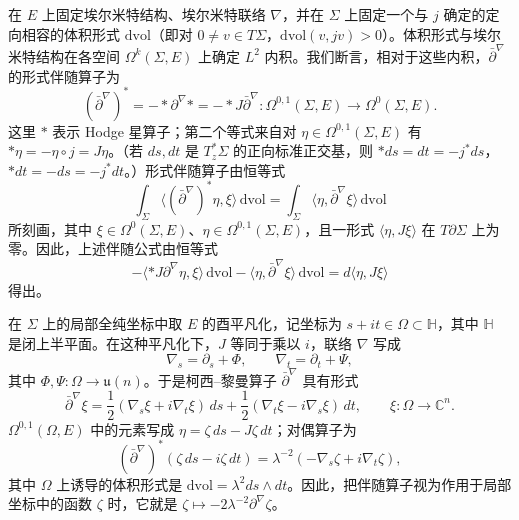 \begin{remark}\label{rem:C-1-3}
在 $E$ 上固定埃尔米特结构、埃尔米特联络 $\nabla$，并在 $\Sigma$ 上固定一个与 $j$ 确定的定向相容的体积形式 $\mathrm{dvol}$（即对 $0\ne v\in T\Sigma$，$\mathrm{dvol}(v,jv)>0$）。体积形式与埃尔米特结构在各空间 $\Omega^k(\Sigma,E)$ 上确定 $L^2$ 内积。我们断言，相对于这些内积，$\bar\partial^\nabla$ 的形式伴随算子为
\begin{equation}\label{eq:C-1-1}
  (\bar\partial^\nabla)^*=-*\partial^\nabla*=-*J\bar\partial^\nabla:
  \Omega^{0,1}(\Sigma,E)\longrightarrow\Omega^0(\Sigma,E).
\end{equation}
这里 $*$ 表示 Hodge 星算子；第二个等式来自对 $\eta\in\Omega^{0,1}(\Sigma,E)$ 有 $*\eta=-\eta\circ j=J\eta$。（若 $ds,dt$ 是 $T_z^*\Sigma$ 的正向标准正交基，则 $*ds=dt=-j^*ds$，$*dt=-ds=-j^*dt$。）形式伴随算子由恒等式
\begin{equation}\label{eq:C-1-2}
  \int_\Sigma\langle(\bar\partial^\nabla)^*\eta,\xi\rangle\,\mathrm{dvol}
  =\int_\Sigma\langle\eta,\bar\partial^\nabla\xi\rangle\,\mathrm{dvol}
\end{equation}
所刻画，其中 $\xi\in\Omega^0(\Sigma,E)$、$\eta\in\Omega^{0,1}(\Sigma,E)$，且一形式 $\langle\eta,J\xi\rangle$ 在 $T\partial\Sigma$ 上为零。因此，上述伴随公式由恒等式
\[
  -\langle*J\partial^\nabla\eta,\xi\rangle\,\mathrm{dvol}
  -\langle\eta,\bar\partial^\nabla\xi\rangle\,\mathrm{dvol}
  =d\langle\eta,J\xi\rangle
\]
得出。
\end{remark}

\begin{remark}\label{rem:C-1-4}
在 $\Sigma$ 上的局部全纯坐标中取 $E$ 的酉平凡化，记坐标为 $s+it\in\Omega\subset\mathbb H$，其中 $\mathbb H$ 是闭上半平面。在这种平凡化下，$J$ 等同于乘以 $i$，联络 $\nabla$ 写成
\[
  \nabla_s=\partial_s+\Phi,\qquad
  \nabla_t=\partial_t+\Psi,
\]
其中 $\Phi,\Psi:\Omega\to\mathfrak u(n)$。于是柯西–黎曼算子 $\bar\partial^\nabla$ 具有形式
\[
  \bar\partial^\nabla\xi
  =\frac12(\nabla_s\xi+i\nabla_t\xi)\,ds
   +\frac12(\nabla_t\xi-i\nabla_s\xi)\,dt,
  \qquad \xi:\Omega\to\mathbb C^n.
\]
$\Omega^{0,1}(\Omega,E)$ 中的元素写成 $\eta=\zeta\,ds-J\zeta\,dt$；对偶算子为
\[
  (\bar\partial^\nabla)^*(\zeta\,ds-i\zeta\,dt)
  =\lambda^{-2}(-\nabla_s\zeta+i\nabla_t\zeta),
\]
其中 $\Omega$ 上诱导的体积形式是 $\mathrm{dvol}=\lambda^2ds\wedge dt$。因此，把伴随算子视为作用于局部坐标中的函数 $\zeta$ 时，它就是 $\zeta\mapsto-2\lambda^{-2}\partial^\nabla\zeta$。
\end{remark}

